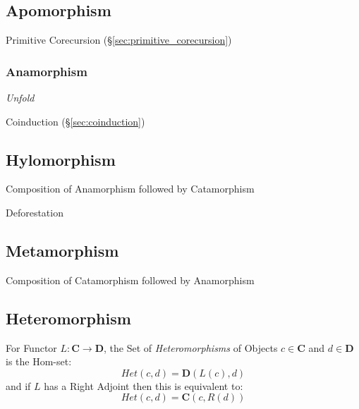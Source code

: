 \subsection{Apomorphism}\label{sec:apomorphism}

Primitive Corecursion (\S\ref{sec:primitive_corecursion})



\subsubsection{Anamorphism}\label{sec:anamorphism}

\emph{Unfold}

Coinduction (\S\ref{sec:coinduction})



\subsection{Hylomorphism}\label{sec:hylomorphism}

Composition of Anamorphism followed by Catamorphism

Deforestation



\subsection{Metamorphism}\label{sec:metamorphism}

Composition of Catamorphism followed by Anamorphism



\subsection{Heteromorphism}\label{sec:heteromorphism}

For Functor $L : \mathbf{C} \rightarrow \mathbf{D}$, the Set of
\emph{Heteromorphisms} of Objects $c \in \mathbf{C}$ and $d \in
\mathbf{D}$ is the Hom-set:
\[
  Het(c,d) = \mathbf{D}(L(c), d)
\]
and if $L$ has a Right Adjoint then this is equivalent to:
\[
  Het(c,d) = \mathbf{C}(c, R(d))
\]


